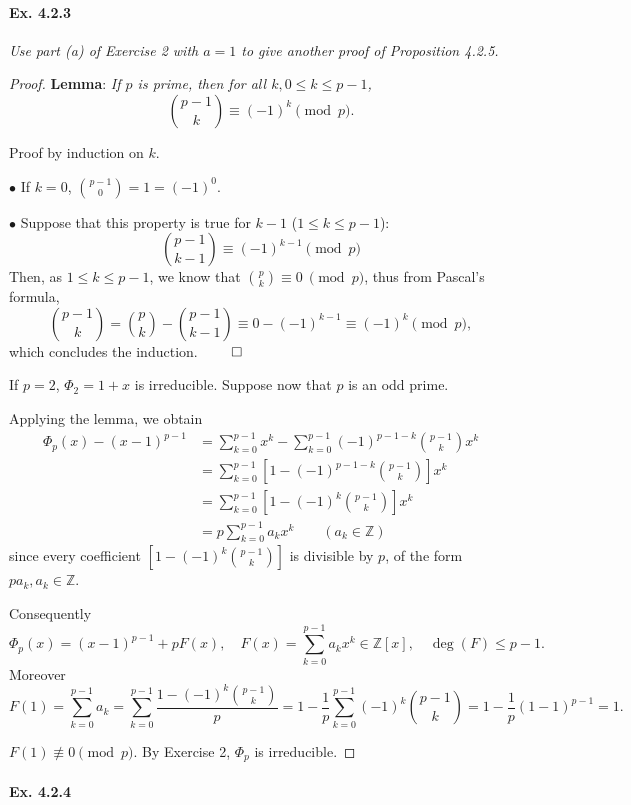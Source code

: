 \documentclass[11pt,a4paper]{article}
\newcommand{\Z}{\mathbb{Z}}
\begin{document}
\paragraph{Ex. 4.2.3}

{\it Use part (a) of Exercise 2 with $a=1$ to give another proof of Proposition 4.2.5.
}

\begin{proof}
{\bf Lemma}: {\it If $p$ is prime, then for all $k, 0\leq k \leq p-1$,
$$\binom{p-1}{k} \equiv (-1)^k \pmod p.$$}

Proof by induction on $k$.

$\bullet$ If $k=0$, $\binom{p-1}{0} = 1 = (-1)^0$.

$\bullet$ Suppose that this property is true for $k-1$ ($1\leq k \leq p-1$): 
$$\binom{p-1}{k-1} \equiv (-1)^{k-1} \pmod p$$
 Then, as $1\leq k \leq p-1$, we know that $\binom{p}{k} \equiv 0\  \pmod p$, thus from Pascal's formula,
$$\binom{p-1}{k} = \binom{p}{k} - \binom{p-1}{k-1} \equiv 0 - (-1)^{k-1} \equiv (-1)^{k} \pmod p,$$
which concludes the induction. $\qed$

If $p = 2$, $\Phi_2 = 1+x$ is irreducible. Suppose now that $p$ is an odd prime. 

Applying the lemma, we obtain
\begin{align*}
\Phi_p(x) - (x-1)^{p-1} &= \sum_{k=0}^{p-1} x^k -\sum_{k=0}^{p-1}(-1)^{p-1-k} \binom{p-1}{k} x^k\\
&=\sum_{k=0}^{p-1} \left[ 1 - (-1)^{p-1-k} \binom{p-1}{k} \right] x^k\\
&=\sum_{k=0}^{p-1} \left[ 1 - (-1)^{k} \binom{p-1}{k} \right] x^k\\
&=p \sum_{k=0}^{p-1} a_k x^k \qquad (a_k \in \Z)
\end{align*}
since every coefficient $\left[ 1 - (-1)^{k} \binom{p-1}{k} \right]$ is divisible by $p$, of the form $p a_k, a_k \in \mathbb{Z}$.

Consequently $$\Phi_p(x) = (x-1)^{p-1} + pF(x),\quad F(x) = \sum_{k=0}^{p-1} a_k x^k \in \mathbb{Z}[x],\quad \deg(F) \leq p-1.$$
Moreover 
$$F(1) = \sum_{k=0}^{p-1} a_k =  \sum_{k=0}^{p-1} \frac{ 1 - (-1)^{k} \binom{p-1}{k} }{p} = 1 -  \frac{1}{p} \sum_{k=0}^{p-1}(-1)^{k} \binom{p-1}{k} = 1 - \frac{1}{p}(1-1)^{p-1} = 1.$$

$F(1)\not \equiv 0 \pmod p$. By Exercise 2, $\Phi_p$ is irreducible.
\end{proof}

\paragraph{Ex. 4.2.4}
\end{document}
